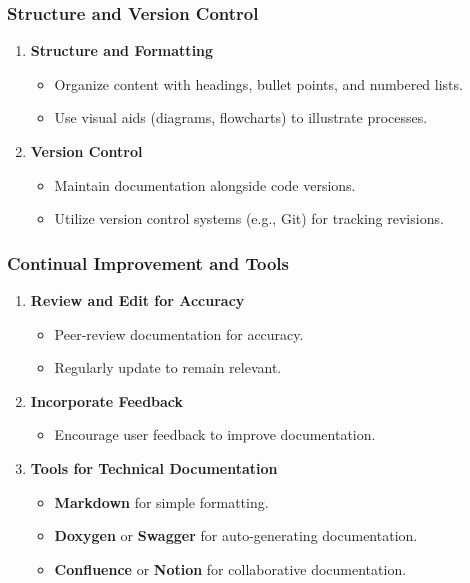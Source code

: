 \documentclass{beamer}
\begin{document}
\begin{frame}[fragile]
    \frametitle{Structure and Version Control}
    \begin{enumerate}[resume]
        \item \textbf{Structure and Formatting}
        \begin{itemize}
            \item Organize content with headings, bullet points, and numbered lists.
            \item Use visual aids (diagrams, flowcharts) to illustrate processes.
        \end{itemize}
        \item \textbf{Version Control}
        \begin{itemize}
            \item Maintain documentation alongside code versions.
            \item Utilize version control systems (e.g., Git) for tracking revisions.
        \end{itemize}
    \end{enumerate}
\end{frame}

\begin{frame}[fragile]
    \frametitle{Continual Improvement and Tools}
    \begin{enumerate}[resume]
        \item \textbf{Review and Edit for Accuracy}
        \begin{itemize}
            \item Peer-review documentation for accuracy.
            \item Regularly update to remain relevant.
        \end{itemize}
        \item \textbf{Incorporate Feedback}
        \begin{itemize}
            \item Encourage user feedback to improve documentation.
        \end{itemize}
        \item \textbf{Tools for Technical Documentation}
        \begin{itemize}
            \item \textbf{Markdown} for simple formatting.
            \item \textbf{Doxygen} or \textbf{Swagger} for auto-generating documentation.
            \item \textbf{Confluence} or \textbf{Notion} for collaborative documentation.
        \end{itemize}
    \end{enumerate}
\end{frame}
\end{document}
